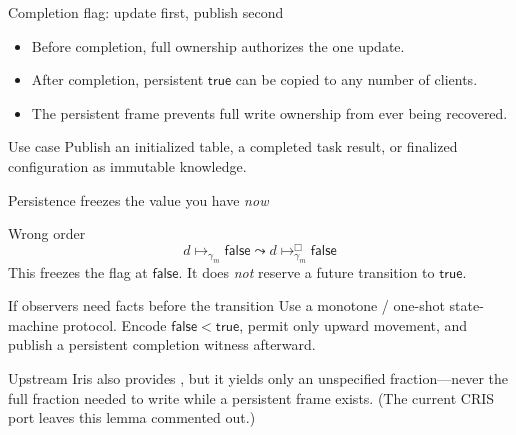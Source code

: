 \documentclass[aspectratio=169,10pt]{beamer}
\newcommand{\ptfull}[2]{#1\mathrel{\mapsto_{\gamma_m}}#2}
\newcommand{\ptro}[2]{#1\mathrel{\mapsto_{\gamma_m}^{\Box}}#2}
\newcommand{\upd}{\mathrel{\leadsto}}
\newcommand{\code}[1]{\texttt{\detokenize{#1}}}
\begin{document}
\begin{frame}{Completion flag: update first, publish second}
  \begin{center}
  \end{center}

  \vspace{0.7cm}
  \begin{itemize}
    \item Before completion, full ownership authorizes the one update.
    \item After completion, persistent \(\mathsf{true}\) can be copied to any number of clients.
    \item The persistent frame prevents full write ownership from ever being recovered.
  \end{itemize}

  \begin{exampleblock}{Use case}
    Publish an initialized table, a completed task result, or finalized configuration as immutable knowledge.
  \end{exampleblock}
\end{frame}

\begin{frame}{Persistence freezes the value you have \emph{now}}
  \begin{alertblock}{Wrong order}
    \[
      \ptfull{d}{\mathsf{false}}\upd\ptro{d}{\mathsf{false}}
    \]
    This freezes the flag at \(\mathsf{false}\). It does \emph{not} reserve a future transition to \(\mathsf{true}\).
  \end{alertblock}

  \vspace{0.35cm}
  \begin{block}{If observers need facts before the transition}
    Use a monotone / one-shot state-machine protocol. Encode \(\mathsf{false}<\mathsf{true}\), permit only upward movement, and publish a persistent completion witness afterward.
  \end{block}

  \vspace{0.2cm}
  \small
  Upstream Iris also provides \code{ghost_map_elem_unpersist}, but it yields only an unspecified fraction---never the full fraction needed to write while a persistent frame exists. (The current CRIS port leaves this lemma commented out.)
\end{frame}
\end{document}
